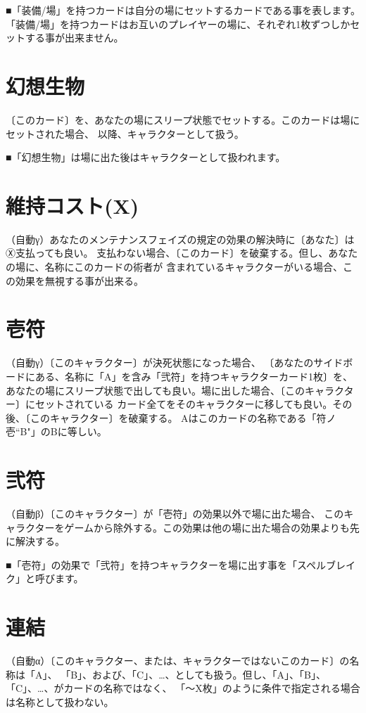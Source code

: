 \documentclass[fontsize=9pt,twocolumn,hanging_punctuation]{jlreq}
\newcommand{\↴}{{\fontspec{HackGen}↴}}
\begin{document}
■「装備/場」を持つカードは自分の場にセットするカードである事を表します。
「装備/場」を持つカードはお互いのプレイヤーの場に、それぞれ1枚ずつしかセットする事が出来ません。

\section*{幻想生物}
〔このカード〕を、あなたの場にスリープ状態でセットする。このカードは場にセットされた場合、
以降、キャラクターとして扱う。

■「幻想生物」は場に出た後はキャラクターとして扱われます。

\section*{維持コスト(X)}
（自動γ）あなたのメンテナンスフェイズの規定の効果の解決時に〔あなた〕はⓍ支払っても良い。
支払わない場合、〔このカード〕を破棄する。但し、あなたの場に、名称にこのカードの術者が
含まれているキャラクターがいる場合、この効果を無視する事が出来る。

\section*{壱符}
（自動γ）〔このキャラクター〕が決死状態になった場合、
〔あなたのサイドボードにある、名称に「A」を含み「弐符」を持つキャラクターカード1枚〕を、
あなたの場にスリープ状態で出しても良い。場に出した場合、〔このキャラクター〕にセットされている
カード全てをそのキャラクターに移しても良い。その後、〔このキャラクター〕を破棄する。
Aはこのカードの名称である「符ノ壱``B"」のBに等しい。

\section*{弐符}
（自動β）〔このキャラクター〕が「壱符」の効果以外で場に出た場合、
このキャラクターをゲームから除外する。この効果は他の場に出た場合の効果よりも先に解決する。

■「壱符」の効果で「弐符」を持つキャラクターを場に出す事を「スペルブレイク」と呼びます。

\pagebreak
\section*{連結}
（自動α）〔このキャラクター、または、キャラクターではないこのカード〕の名称は「A」、
「B」、および、「C」、…、としても扱う。但し、「A」、「B」、「C」、…、がカードの名称ではなく、
「～X枚」のように条件で指定される場合は名称として扱わない。
\end{document}
